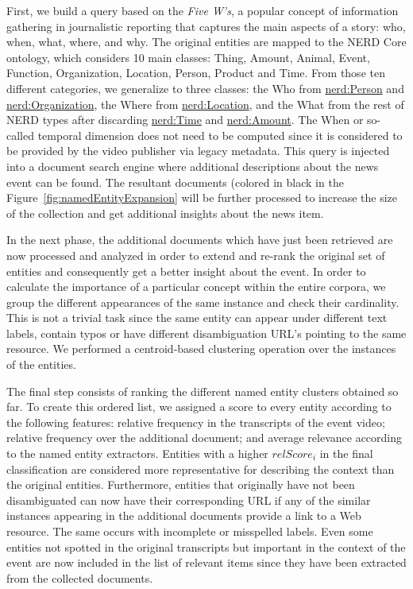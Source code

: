 \documentclass[a4paper,11pt]{report}
\begin{document}
First, we build a query based on the \emph{Five W's}, a popular concept of information gathering in journalistic reporting that captures the main aspects of a story: who, when, what, where, and why. The original entities are mapped to the NERD Core ontology, which considers 10 main classes: Thing, Amount, Animal, Event, Function, Organization, Location, Person, Product and Time. From those ten different categories, we generalize to three classes: the Who from \url{nerd:Person} and \url{nerd:Organization}, the Where from \url{nerd:Location}, and the What from the rest of NERD types after discarding \url{nerd:Time} and \url{nerd:Amount}. The When or so-called temporal dimension does not need to be computed since it is considered to be provided by the video publisher via legacy metadata. This query is injected into a document search engine where additional descriptions about the news event can be found.  The resultant documents (colored in black in the Figure~\ref{fig:namedEntityExpansion} will be further processed to increase the size of the collection and get additional insights about the news item.

In the next phase, the additional documents which have just been retrieved are now processed and analyzed in order to extend and re-rank the original set of entities and consequently get a better insight about the event. 
In order to calculate the importance of a particular concept within the entire corpora, we group the different appearances of the same instance and check their cardinality. This is not a trivial task since the same entity can appear under different text labels, contain typos or have different disambiguation URL's pointing to the same resource. We performed a centroid-based clustering operation over the instances of the entities. 

The final step consists of ranking the different named entity clusters obtained so far. To create this ordered list, we assigned a score to every entity according to the following features: relative frequency in the transcripts of the event video; relative frequency over the additional document; and average relevance according to the named entity extractors. Entities with a higher $relScore_{i}$ in the final classification are considered more representative for describing the context than the original entities. Furthermore, entities that originally have not been disambiguated can now have their corresponding URL if any of the similar instances appearing in the additional documents provide a link to a Web resource. The same occurs with incomplete or misspelled labels. Even some entities not spotted in the original transcripts but important in the context of the event are now included in the list of relevant items since they have been extracted from the collected documents.
\end{document}
